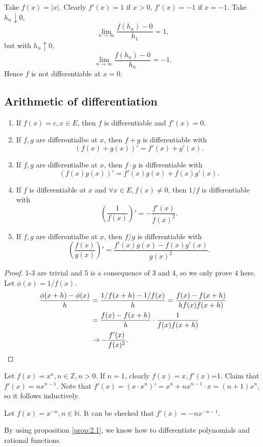 \begin{example}
    Take $f(x)=|x|$. Clearly $f'(x)=1$ if $x>0$, $f'(x)=-1$ if $x=-1$. Take $ h_n\downarrow 0 $,
    \[
        \lim_{n \to \infty} \frac{f(h_n)-0}{h_1}=1,
    \]
    but with $ h_n \uparrow 0 $,
    \[
        \lim_{n \to \infty} \frac{f(h_n)-0}{h_n}=-1.
    \]
    Hence $f$ is not differentiable at $x=0$.
\end{example}
\subsection{Arithmetic of differentiation}
\begin{proposition}
    \begin{enumerate}
        \item If $f(x)=c,x\in E$, then $f$ is differentiable and $f'(x)=0$.
        \item If $f,g$ are differentialbe at $x$, then $f+g$ is differentiable with
        \[
            (f(x)+g(x))' = f'(x)+g'(x).
        \]
        \item If $f,g$ are differentialbe at $x$, then $f\cdot g$ is differentiable with
        \[
            (f(x)g(x))'=f'(x)g(x)+f(x)g'(x).
        \]
        \item If $f$ is differentiable at $x$ and $ \forall x\in E,f(x)\neq 0 $, then $ 1/f $ is differentiable with 
        \[
            \left( \frac{1}{f(x)} \right)' = -\frac{f'(x)}{f(x)^2}.
        \]
        \item If $f,g$ are differentialbe at $x$, then $f/ g$ is differentiable with
        \[
            \left( \frac{f(x)}{g(x)} \right)' = \frac{f'(x)g(x)-f(x)g'(x)}{g(x)^2}.
        \]
    \end{enumerate}
\end{proposition}
\begin{proof}
    1-3 are trivial and 5 is a consequence of 3 and 4, so we only prove 4 here. Let $ \phi(x) = 1/f(x) $. 
    \begin{align*}
        \frac{\phi(x+h)-\phi(x)}{h} &= \frac{1/f(x+h)-1/f(x)}{h}=\frac{f(x)-f(x+h)}{hf(x)f(x+h)}  \\ 
        &= \frac{f(x)-f(x+h)}{h}\cdot \frac{1}{f(x)f(x+h)}\\ 
        &\to -\frac{f'(x)}{f(x)^2}.\qedhere
    \end{align*} 
\end{proof}

\begin{example}
    Let $ f(x) = x^n, n\in \mathbb{Z}, n>0 $. If $n=1$, clearly $f(x)=x,f'(x)$=1. Claim that $ f'(x) = nx^{n-1} $. Note that $ f'(x) = (x \cdot x^{n})' = x^{n}+nx^{n-1} \cdot x = (n+1) x^{n} $, so it follows inductively. 
\end{example}
\begin{example}
    Let $ f(x) = x^{-n},n\in \mathbb{N} $. It can be checked that $ f'(x)=-nx^{-n-1} $.
\end{example}
By using proposition \ref{prop:2.1}, we know how to differentiate polynomials and rational functions.

